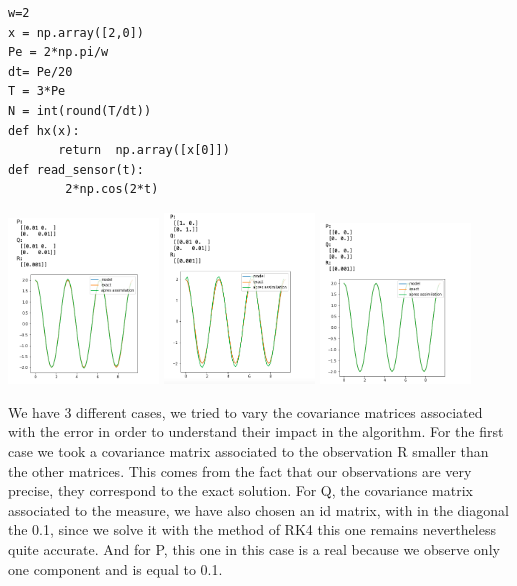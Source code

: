 \begin{lstlisting}
w=2
x = np.array([2,0])
Pe = 2*np.pi/w
dt= Pe/20
T = 3*Pe
N = int(round(T/dt))
def hx(x):
       return  np.array([x[0]])
def read_sensor(t):
        2*np.cos(2*t)
\end{lstlisting}
\begin{center}
		\includegraphics[width=0.3\textwidth]{"images/oscillator1.png"}
		\includegraphics[width=0.3\textwidth]{"images/oscillator2.png"}
		\includegraphics[width=0.3\textwidth]{"images/oscillator3.png"}
	\end{center}
We have 3 different cases, we tried to vary the covariance matrices associated with the error in order to understand their impact in the algorithm. For the first case we took a covariance matrix associated to the observation R smaller than the other matrices. This comes from the fact that our observations are very precise, they correspond to the exact solution. For Q, the covariance matrix associated to the measure, we have also chosen an id matrix, with in the diagonal the 0.1, since we solve it with the method of RK4 this one remains nevertheless quite accurate. And for P, this one in this case is a real because we observe only one component and is equal to 0.1.
